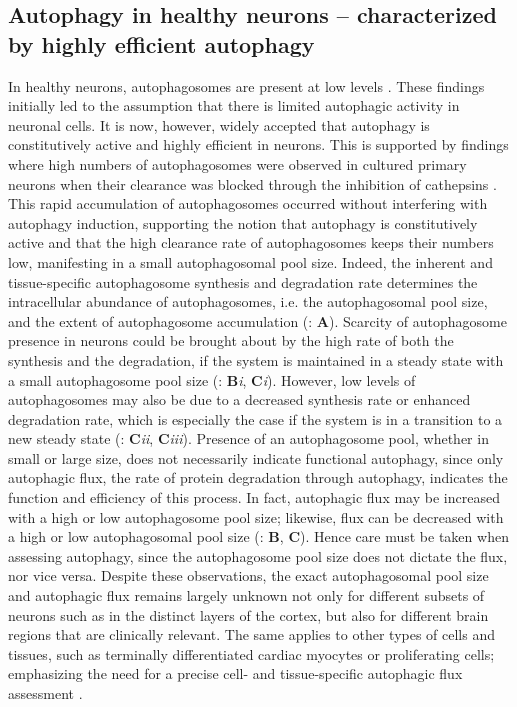 \subsection{Autophagy in healthy neurons – characterized by highly efficient autophagy}
In healthy neurons, autophagosomes are present at low levels \citep{Boland2008,Mizushima2004a,Nixon2005}. These findings initially led to the assumption that there is limited autophagic activity in neuronal cells. It is now, however, widely accepted that autophagy is constitutively active and highly efficient in neurons. This is supported by findings where high numbers of autophagosomes were observed in cultured primary neurons when their clearance was blocked through the inhibition of cathepsins \citep{Boland2008}. This rapid accumulation of autophagosomes occurred without interfering with autophagy induction, supporting the notion that autophagy is constitutively active and that the high clearance rate of autophagosomes keeps their numbers low, manifesting in a small autophagosomal pool size. Indeed, the inherent and tissue-specific \citep{Mizushima2004a} autophagosome synthesis and degradation rate determines the intracellular abundance of autophagosomes, i.e. the autophagosomal pool size, and the extent of autophagosome accumulation (: \textbf{A}). Scarcity of autophagosome presence in neurons could be brought about by the high rate of both the synthesis and the degradation, if the system is maintained in a steady state with a small autophagosome pool size (: \textbf{B}\textit{i}, \textbf{C}\textit{i}). However, low levels of autophagosomes may also be due to a decreased synthesis rate or enhanced degradation rate, which is especially the case if the system is in a transition to a new steady state (: \textbf{C}\textit{ii}, \textbf{C}\textit{iii}). Presence of an autophagosome pool, whether in small or large size, does not necessarily indicate functional autophagy, since only autophagic flux, the rate of protein degradation through autophagy, indicates the function and efficiency of this process. In fact, autophagic flux may be increased with a high or low autophagosome pool size; likewise, flux can be decreased with a high or low autophagosomal pool size \citep{loos2014} (: \textbf{B}, \textbf{C}). Hence care must be taken when assessing autophagy, since the autophagosome pool size does not dictate the flux, nor vice versa. Despite these observations, the exact autophagosomal pool size and autophagic flux remains largely unknown not only for different subsets of neurons such as in the distinct layers of the cortex, but also for different brain regions that are clinically relevant. The same applies to other types of cells and tissues, such as terminally differentiated cardiac myocytes or proliferating cells; emphasizing the need for a precise cell- and tissue-specific autophagic flux assessment \citep{Kaizuka2016}.

